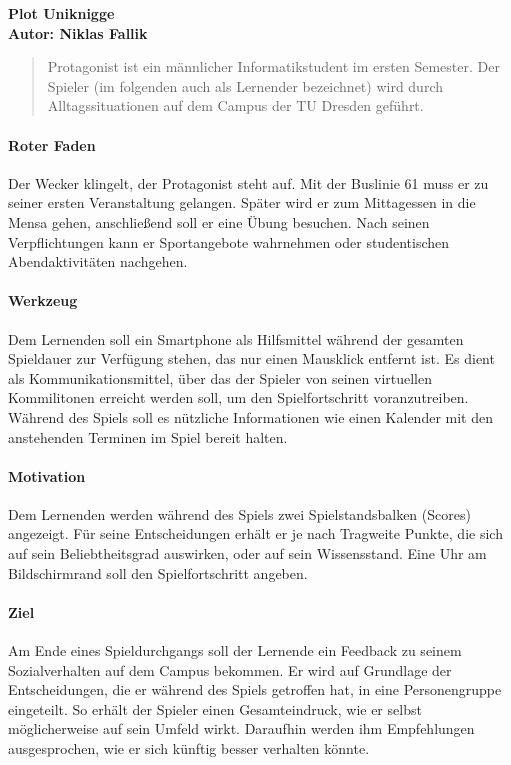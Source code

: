 \documentclass[a4paper,10pt]{article}
\begin{document}
\vspace*{1cm}

{\bfseries \large Plot Uniknigge \\[1mm]		%
\normalfont Autor: Niklas Fallik}					%

\vspace{1cm}

\begin{abstract}					
	Protagonist ist ein männlicher Informatikstudent im ersten Semester. Der Spieler (im folgenden auch als Lernender bezeichnet) wird durch Alltagssituationen auf dem Campus der TU Dresden geführt.
\end{abstract}
\vspace{1cm}

\paragraph{Roter Faden}
	Der Wecker klingelt, der Protagonist steht auf. Mit der Buslinie 61 muss er zu seiner ersten Veranstaltung gelangen. Später wird er zum Mittagessen in die Mensa gehen, anschließend soll er eine Übung besuchen. Nach seinen Verpflichtungen kann er Sportangebote wahrnehmen oder studentischen Abendaktivitäten nachgehen.

\paragraph{Werkzeug}
	Dem Lernenden soll ein Smartphone als Hilfsmittel während der gesamten Spieldauer zur Verfügung stehen, das nur einen Mausklick entfernt ist. Es dient als Kommunikationsmittel, über das der Spieler von seinen virtuellen Kommilitonen erreicht werden soll, um den Spielfortschritt voranzutreiben. Während des Spiels soll es nützliche Informationen wie einen Kalender mit den anstehenden Terminen im Spiel bereit halten.

\paragraph{Motivation}
	Dem Lernenden werden während des Spiels zwei Spielstandsbalken (Scores) angezeigt. Für seine Entscheidungen erhält er je nach Tragweite Punkte, die sich auf sein Beliebtheitsgrad auswirken, oder auf sein Wissensstand. Eine Uhr am Bildschirmrand soll den Spielfortschritt angeben.

\paragraph{Ziel}
	Am Ende eines Spieldurchgangs soll der Lernende ein Feedback zu seinem Sozialverhalten auf dem Campus bekommen. Er wird auf Grundlage der Entscheidungen, die er während des Spiels getroffen hat, in eine Personengruppe eingeteilt. So erhält der Spieler einen Gesamteindruck, wie er selbst möglicherweise auf sein Umfeld wirkt. Daraufhin werden ihm Empfehlungen ausgesprochen, wie er sich künftig besser verhalten könnte.
\end{document}
